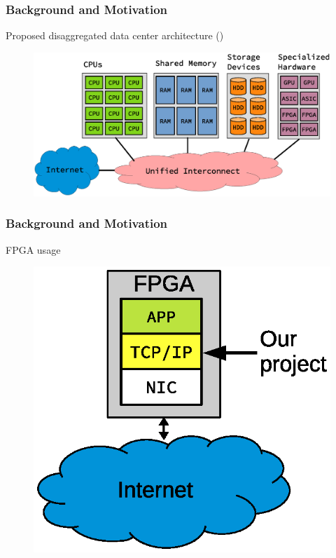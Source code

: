 \begin{frame}
\frametitle{Background and Motivation}
Proposed disaggregated data center architecture (\cite{7830659})
\begin{figure}
	\centering
\includegraphics[scale=0.5]{./background/dc_architectures_disaggregated.eps}
\end{figure}
\end{frame}


\begin{frame}
\frametitle{Background and Motivation}
FPGA usage
\begin{figure}
	\centering
\includegraphics[scale=0.5]{./background/fpga_usage.eps}
\end{figure}

\end{frame}

